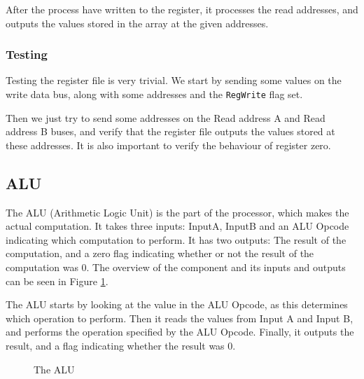 After the process have written to the register, it processes the read
addresses, and outputs the values stored in the array at the given addresses.

\subsubsection*{Testing}
Testing the register file is very trivial. We start by sending some values
on the write data bus, along with some addresses and the \texttt{RegWrite}
flag set.

Then we just try to send some addresses on the Read address A and Read
address B buses, and verify that the register file outputs the values
stored at these addresses. It is also important to verify the behaviour of
register zero.

\subsection{ALU}
The ALU (Arithmetic Logic Unit) is the part of the processor, which makes the
actual computation. It takes three inputs: InputA, InputB and an ALU Opcode
indicating which computation to perform. It has two outputs: The result of the
computation, and a zero flag indicating whether or not the result of the
computation was 0. The overview of the component and its inputs and outputs can
be seen in Figure \ref{fig:alu}.

The ALU starts by looking at the value in the ALU Opcode, as this determines
which operation to perform. Then it reads the values from Input A and Input B,
and performs the operation specified by the ALU Opcode. Finally, it outputs the
result, and a flag indicating whether the result was 0.

\begin{figure}
    \centering
    \caption{The ALU}
    \label{fig:alu}
\end{figure}

